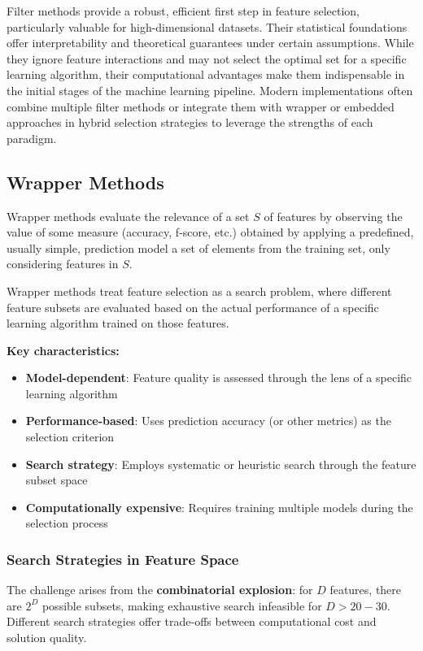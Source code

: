 Filter methods provide a robust, efficient first step in feature selection, particularly valuable for high-dimensional datasets. Their statistical foundations offer interpretability and theoretical guarantees under certain assumptions. While they ignore feature interactions and may not select the optimal set for a specific learning algorithm, their computational advantages make them indispensable in the initial stages of the machine learning pipeline. Modern implementations often combine multiple filter methods or integrate them with wrapper or embedded approaches in hybrid selection strategies to leverage the strengths of each paradigm.




\subsection*{Wrapper Methods}
Wrapper methods evaluate the relevance of a set $S$ of features by observing the value of some measure (accuracy, f-score, etc.) obtained by applying a predefined, usually simple, prediction model a set of elements from the training set, only considering features in $S$.

Wrapper methods treat feature selection as a \alert{search problem}, where different feature subsets are evaluated based on the actual performance of a specific learning algorithm trained on those features.

\textbf{Key characteristics:}
\begin{itemize}
\item \textbf{Model-dependent}: Feature quality is assessed through the lens of a specific learning algorithm
\item \textbf{Performance-based}: Uses prediction accuracy (or other metrics) as the selection criterion
\item \textbf{Search strategy}: Employs systematic or heuristic search through the feature subset space
\item \textbf{Computationally expensive}: Requires training multiple models during the selection process
\end{itemize}

\subsubsection*{Search Strategies in Feature Space}

The challenge arises from the \textbf{combinatorial explosion}: for $D$ features, there are $2^D$ possible subsets, making exhaustive search infeasible for $D > 20-30$. Different search strategies offer trade-offs between computational cost and solution quality.

